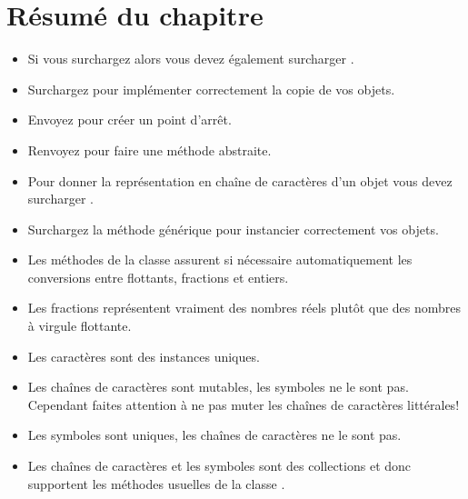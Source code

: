 \documentclass[a4paper,10pt,twoside]{book}
\begin{document}
\section{R\'esum\'e du chapitre}

\begin{itemize}

  \item Si vous surchargez \ct{=} alors vous devez \'egalement surcharger .

  \item Surchargez  pour impl\'ementer correctement la copie de vos objets.

  \item Envoyez  pour cr\'eer un point d'arr\^et.

  \item Renvoyez  pour faire une m\'ethode abstraite.

  \item Pour donner la repr\'esentation en cha\^ine de caract\`eres d'un objet  vous devez surcharger .

  \item Surchargez la m\'ethode g\'en\'erique  pour instancier correctement vos objets.


  \item Les m\'ethodes de la classe  assurent si n\'ecessaire automatiquement les conversions entre flottants, fractions et entiers.

  \item Les fractions repr\'esentent vraiment des nombres r\'eels plut\^ot que des nombres \`a virgule flottante.

  \item Les caract\`eres sont des instances uniques.

  \item Les cha\^ines de caract\`eres sont mutables, les symboles ne le sont pas.
  Cependant faites attention \`a ne pas muter les cha\^ines de caract\`eres litt\'erales!

  \item Les symboles sont uniques, les cha\^ines de caract\`eres ne le sont pas.

  \item Les cha\^ines de caract\`eres et les symboles sont des collections et donc supportent les m\'ethodes usuelles de la classe .

\end{itemize}

\ifx\wholebook\relax\else
   
   
\end{document}
